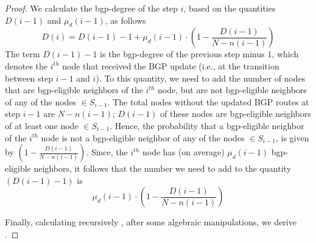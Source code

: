 \begin{proof}
We calculate the bgp-degree of the step $i$, based on the quantities $D(i-1)$ and $\mu_{d}(i-1)$, as follows
\begin{equation}\label{eq:Di_Di-1}
D(i) = D(i-1) - 1 + \mu_{d}(i-1)\cdot \left(1- \frac{D(i-1)}{N-n(i-1)}\right)
\end{equation}
The term $D(i-1) - 1$ is the bgp-degree of the previous step minus $1$, which denotes the $i^{th}$ node that received the BGP update (i.e., at the transition between step $i-1$ and $i$). To this quantity, we need to add the number of nodes that are bgp-eligible neighbors of the $i^{th}$ node, but are not bgp-eligible neighbors of any of the nodes $\in S_{i-1}$. The total nodes without the updated BGP routes at step $i-1$ are $N-n(i-1)$; $D(i-1)$ of these nodes are bgp-eligible neighbors of at least one node $\in S_{i-1}$. Hence, the probability that a bgp-eligible neighbor of the $i^{th}$ node is not a bgp-eligible neighbor of any of the nodes $\in S_{i-1}$, is given by $\left(1- \frac{D(i-1)}{N-n(i-1)}\right)$. Since, the $i^{th}$ node has (on average) $\mu_{d}(i-1)$ bgp-eligible neighbors, it follows that the number we need to add to the quantity $(D(i-1) - 1)$ is 
\begin{equation}
\mu_{d}(i-1) \cdot \left(1- \frac{D(i-1)}{N-n(i-1)}\right)
\end{equation} 

Finally, calculating recursively , after some algebraic manipulations, we derive . 

\end{proof}
